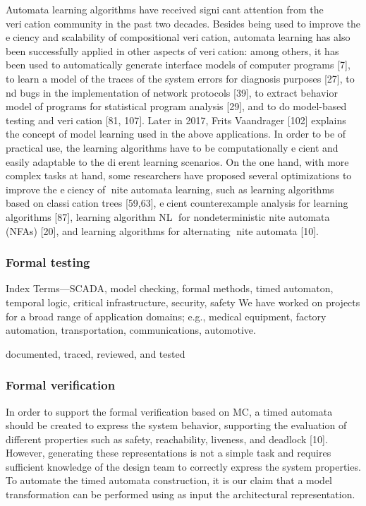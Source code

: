 \documentclass{article}
\begin{document}
		Automata learning algorithms have received signicant attention from the
		verication community in the past two decades. Besides being used to improve
		the eciency and scalability of compositional verication, automata learning has
		also been successfully applied in other aspects of verication: among others, it has
		been used to automatically generate interface models of computer programs [7],
		to learn a model of the traces of the system errors for diagnosis purposes [27], to
		nd bugs in the implementation of network protocols [39], to extract behavior
		model of programs for statistical program analysis [29], and to do model-based
		testing and verication [81, 107]. Later in 2017, Frits Vaandrager [102] explains
		the concept of model learning used in the above applications.
		In order to be of practical use, the learning algorithms have to be computationally
		ecient and easily adaptable to the dierent learning scenarios. On the
		one hand, with more complex tasks at hand, some researchers have proposed several
		optimizations to improve the eciency of nite automata learning, such as
		learning algorithms based on classication trees [59,63], ecient counterexample
		analysis for learning algorithms [87], learning algorithm NL for nondeterministic
		nite automata (NFAs) [20], and learning algorithms for alternating nite
		automata [10].
		\subsubsection{Formal testing}
		
		Index Terms—SCADA, model checking, formal methods, timed
		automaton, temporal logic, critical infrastructure, security, safety
		We have worked on projects for a broad range of application
		domains; e.g., medical equipment, factory automation, transportation,
		communications, automotive.
		
		
		
		documented, traced, reviewed, and tested
		\subsubsection{Formal  verification}
		In order to support the formal verification based on MC,
		a timed automata should be created to express the system
		behavior, supporting the evaluation of different properties such
		as safety, reachability, liveness, and deadlock [10]. However,
		generating these representations is not a simple task and
		requires sufficient knowledge of the design team to correctly
		express the system properties. To automate the timed automata
		construction, it is our claim that a model transformation can
		be performed using as input the architectural representation.
		
\end{document}
